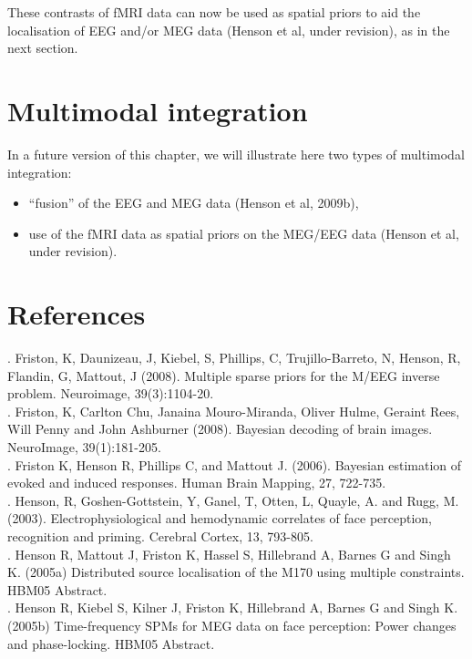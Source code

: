 These contrasts of fMRI data can now be used as spatial priors to aid the localisation of EEG and/or MEG data (Henson et al, under revision), as in the next section.

\section{Multimodal integration \label{multimodal:integration}}

In a future version of this chapter, we will illustrate here two types of multimodal integration:
\begin{itemize}
 \item ``fusion'' of the EEG and MEG data (Henson et al, 2009b),
 \item use of the fMRI data as spatial priors on the MEG/EEG data (Henson et al, under revision).
\end{itemize}

\section{References}

. Friston, K, Daunizeau, J, Kiebel, S, Phillips, C, Trujillo-Barreto, N, Henson, R, Flandin, G, Mattout, J (2008). Multiple sparse priors for the M/EEG inverse problem. Neuroimage, 39(3):1104-20.\\

. Friston, K, Carlton Chu, Janaina Mouro-Miranda, Oliver Hulme, Geraint Rees, Will Penny and John Ashburner (2008). Bayesian decoding of brain images. NeuroImage, 39(1):181-205.\\

. Friston K, Henson R, Phillips C, and Mattout J. (2006). Bayesian estimation of evoked and induced responses. Human Brain Mapping, 27, 722-735.\\

. Henson, R, Goshen-Gottstein, Y, Ganel, T, Otten, L, Quayle, A. and Rugg, M. (2003). Electrophysiological and hemodynamic correlates of face perception, recognition and priming. Cerebral Cortex, 13, 793-805.\\

. Henson R, Mattout J, Friston K, Hassel S, Hillebrand A, Barnes G and Singh K. (2005a) Distributed source localisation of the M170 using multiple constraints. HBM05 Abstract.\\

. Henson R, Kiebel S, Kilner J, Friston K, Hillebrand A, Barnes G and Singh K. (2005b) Time-frequency SPMs for MEG data on face perception: Power changes and phase-locking. HBM05 Abstract.\\

